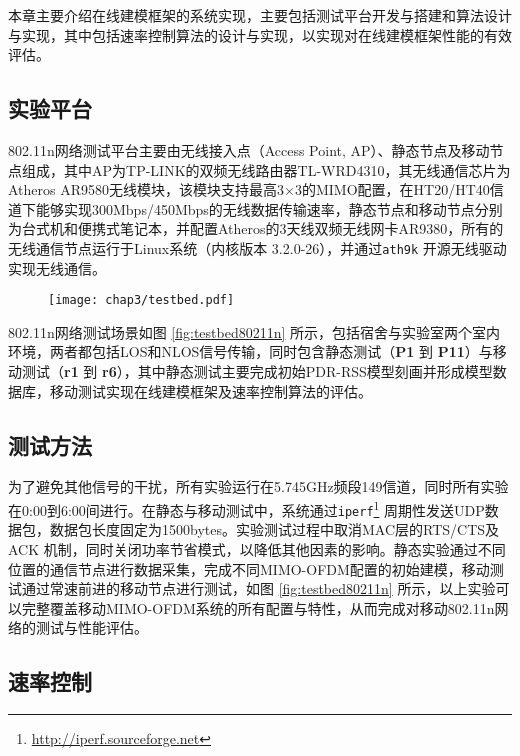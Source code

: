 本章主要介绍在线建模框架的系统实现，主要包括测试平台开发与搭建和算法设计与实现，其中包括速率控制算法的设计与实现，以实现对在线建模框架性能的有效评估。

\subsection{实验平台}
\label{sec:platform80211n}

802.11n网络测试平台主要由无线接入点（Access Point, AP）、静态节点及移动节点组成，其中AP为TP-LINK的双频无线路由器TL-WRD4310，其无线通信芯片为Atheros AR9580无线模块，该模块支持最高3$\times$3的MIMO配置，在HT20/HT40信道下能够实现300Mbps/450Mbps的无线数据传输速率，静态节点和移动节点分别为台式机和便携式笔记本，并配置Atheros的3天线双频无线网卡AR9380，所有的无线通信节点运行于Linux系统（内核版本 3.2.0-26），并通过\texttt{ath9k} 开源无线驱动实现无线通信。

\begin{figure}[!htp]
\centering
\texttt{[image: chap3/testbed.pdf]}
\end{figure}

802.11n网络测试场景如图 \ref{fig:testbed80211n} 所示，包括宿舍与实验室两个室内环境，两者都包括LOS和NLOS信号传输，同时包含静态测试（\textbf{P1} 到 \textbf{P11}）与移动测试（\textbf{r1} 到 \textbf{r6}），其中静态测试主要完成初始PDR-RSS模型刻画并形成模型数据库，移动测试实现在线建模框架及速率控制算法的评估。

\subsection{测试方法}
\label{sec:measurement80211n}

为了避免其他信号的干扰，所有实验运行在5.745GHz频段149信道，同时所有实验在0:00到6:00间进行。在静态与移动测试中，系统通过\texttt{iperf}\footnote{\url{http://iperf.sourceforge.net}} 周期性发送UDP数据包，数据包长度固定为1500bytes。实验测试过程中取消MAC层的RTS/CTS及ACK 机制，同时关闭功率节省模式，以降低其他因素的影响。静态实验通过不同位置的通信节点进行数据采集，完成不同MIMO-OFDM配置的初始建模，移动测试通过常速前进的移动节点进行测试，如图 \ref{fig:testbed80211n} 所示，以上实验可以完整覆盖移动MIMO-OFDM系统的所有配置与特性，从而完成对移动802.11n网络的测试与性能评估。

\subsection{速率控制}
\label{sec:adaption80211n}

